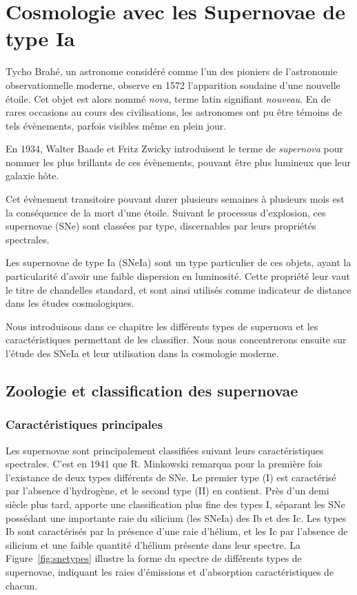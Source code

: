 \documentclass[../main/main.tex]{subfiles}
\begin{document}
\dominitoc
\faketableofcontents
\setcounter{chapter}{1}
\chapter{Cosmologie avec les Supernovae de type Ia}\label{ch:snia}

\minitoc
\vspace{2cm}

Tycho Brahé, un astronome considéré comme l'un des pioniers de l'astronomie
observationnelle moderne, observe en 1572 l'apparition soudaine d'une
nouvelle étoile. Cet objet est alors nommé \textit{nova}, terme latin
signifiant \textit{nouveau}. En de rares occasions au cours des
civilisations, les astronomes ont pu être témoins de tels évènements,
parfois visibles même en plein jour.

En 1934, Walter Baade et Fritz Zwicky introduisent le terme de
\textit{supernova} pour nommer les plus brillants de ces évènements,
pouvant être plus lumineux que leur galaxie hôte.

Cet évènement transitoire pouvant durer plusieurs semaines à plusieurs
mois est la conséquence de la mort d'une étoile. Suivant le processus
d'explosion, ces supernovae (SNe) sont classées par type, discernables
par leurs propriétés spectrales.

Les supernovae de type Ia (SNeIa) sont un type particulier de ces
objets, ayant la particularité d'avoir une faible dispersion en
luminosité. Cette propriété leur vaut le titre de chandelles standard,
et sont ainsi utilisés comme indicateur de distance dans les études
cosmologiques. 

Nous introduisons dans ce chapitre les différents types de supernova et
les caractéristiques permettant de les classifier. Nous nous
concentrerons ensuite sur l'étude des SNeIa et leur utilisation dans la
cosmologie moderne.

\newpage

\section{Zoologie et classification des supernovae}

\subsection{Caractéristiques principales}

Les supernovae sont principalement classifiées suivant leurs
caractéristiques spectrales. C'est en 1941 que R. Minkowski
\citep{Minkowski1941} remarqua pour la première fois l'existance de deux
types différents de SNe. Le premier type (I) est caractérisé par
l'absence d'hydrogène, et le second type (II) en contient.
Près d'un demi siècle plus tard, \citet{Elias1985} apporte une
classification plus fine des types I, séparant les SNe possédant une importante
raie du silicium (les SNeIa) des Ib et des Ic. Les
types Ib sont caractérisés par la présence d'une raie d'hélium, et les
Ic par l'absence de silicium et une faible quantité d'hélium présente
dans leur spectre. La Figure~\ref{fig:snetypes} illustre la forme du
spectre de différents types de supernovae, indiquant les raies
d'émissions et d'absorption caractéristiques de chacun.
\end{document}
